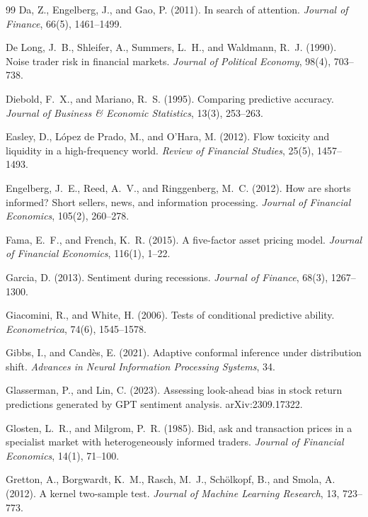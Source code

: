 \documentclass[11pt,a4paper]{article}
\theoremstyle{plain}
\theoremstyle{definition}
\theoremstyle{remark}
\begin{document}
\begin{thebibliography}{99}
Da, Z., Engelberg, J., and Gao, P. (2011). In search of attention. \emph{Journal of Finance}, 66(5), 1461--1499.

De Long, J.~B., Shleifer, A., Summers, L.~H., and Waldmann, R.~J. (1990). Noise trader risk in financial markets. \emph{Journal of Political Economy}, 98(4), 703--738.

Diebold, F.~X., and Mariano, R.~S. (1995). Comparing predictive accuracy. \emph{Journal of Business \& Economic Statistics}, 13(3), 253--263.

Easley, D., L\'opez de Prado, M., and O'Hara, M. (2012). Flow toxicity and liquidity in a high-frequency world. \emph{Review of Financial Studies}, 25(5), 1457--1493.

Engelberg, J.~E., Reed, A.~V., and Ringgenberg, M.~C. (2012). How are shorts informed? Short sellers, news, and information processing. \emph{Journal of Financial Economics}, 105(2), 260--278.

Fama, E.~F., and French, K.~R. (2015). A five-factor asset pricing model. \emph{Journal of Financial Economics}, 116(1), 1--22.

Garcia, D. (2013). Sentiment during recessions. \emph{Journal of Finance}, 68(3), 1267--1300.

Giacomini, R., and White, H. (2006). Tests of conditional predictive ability. \emph{Econometrica}, 74(6), 1545--1578.

Gibbs, I., and Cand\`es, E. (2021). Adaptive conformal inference under distribution shift. \emph{Advances in Neural Information Processing Systems}, 34.

Glasserman, P., and Lin, C. (2023). Assessing look-ahead bias in stock return predictions generated by GPT sentiment analysis. arXiv:2309.17322.

Glosten, L.~R., and Milgrom, P.~R. (1985). Bid, ask and transaction prices in a specialist market with heterogeneously informed traders. \emph{Journal of Financial Economics}, 14(1), 71--100.

Gretton, A., Borgwardt, K.~M., Rasch, M.~J., Sch\"olkopf, B., and Smola, A. (2012). A kernel two-sample test. \emph{Journal of Machine Learning Research}, 13, 723--773.


\end{thebibliography}
\end{document}
